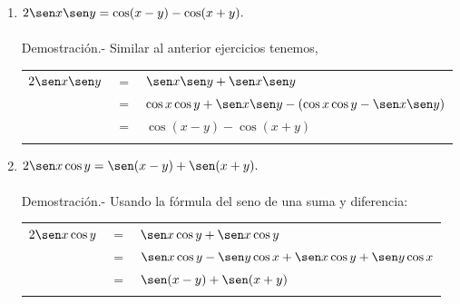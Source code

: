 \begin{enumerate}[\bfseries 1.]
\begin{enumerate}[\bfseries (a)]
	\item $2\sen x \sen y = \cos(x-y)-\cos(x+y).$\\\\
	    Demostración.-\; Similar al anterior ejercicios tenemos,\\
	    \begin{center}
		\begin{tabular}{rcl}
		    $2\sen x \sen y$&$=$&$\sen x \sen y + \sen x \sen y$\\
				    &$=$&$\cos x \cos y + \sen x \sen y - (\cos x \cos y - \sen x \sen y)$\\
				    &$=$&$\cos(x-y)-\cos(x+y)$\\\\
		\end{tabular}
	    \end{center}


	\item $2\sen x \cos y = \sen(x-y)+\sen(x+y).$\\\\
	    Demostración.-\; Usando la fórmula del seno de una suma y diferencia:\\
	    \begin{center}
		\begin{tabular}{rcl}
		    $2\sen x \cos y$&$=$&$\sen x \cos y + \sen x \cos y$\\
		      &$=$&$\sen x \cos y - \sen y \cos x + \sen x \cos y + \sen y \cos x$\\
		      &$=$&$\sen(x-y) + \sen(x+y)$\\\\
		\end{tabular}
	    \end{center}

    \end{enumerate}


\end{enumerate}
